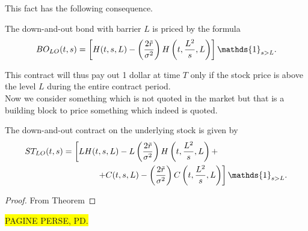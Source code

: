 This fact has the following consequence. 
\begin{proposition}
    The down-and-out bond with barrier $L$ is priced by the formula
    \begin{equation}
        BO_{LO}(t,s) = \left[H(t,s,L) - \left(\dfrac{2\Tilde{r}}{\sigma^2}\right)H\left(t,\frac{L^2}{s},L\right)\right]\mathds{1}_{s>L}.
    \end{equation}
\end{proposition}
This contract will thus pay out 1 dollar at time $T$ only if the stock price is above the level $L$ during the entire contract period. \\
Now we consider something which is not quoted in the market but that is a building block to price something which indeed is quoted.
\begin{proposition}
    The down-and-out contract on the underlying stock is given by
    \begin{align}
        \notag ST_{LO}(t,s) &= \left[LH(t,s,L) - L\left(\dfrac{2\Tilde{r}}{\sigma^2}\right)H\left(t,\frac{L^2}{s},L\right) + \right. \\
        &\qquad\qquad
        \left. + C(t,s,L) - \left(\dfrac{2\Tilde{r}}{\sigma^2}\right)C\left(t,\frac{L^2}{s},L\right)\right]\mathds{1}_{s>L}.
    \end{align}
\end{proposition}
\begin{proof}
    From Theorem 
\end{proof}

\colorbox{yellow}{PAGINE PERSE, PD.}